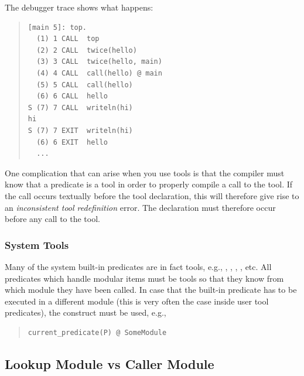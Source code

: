 The debugger trace shows what happens:
\begin{quote}
\begin{verbatim}
[main 5]: top.
  (1) 1 CALL  top
  (2) 2 CALL  twice(hello)
  (3) 3 CALL  twice(hello, main)
  (4) 4 CALL  call(hello) @ main
  (5) 5 CALL  call(hello)
  (6) 6 CALL  hello
S (7) 7 CALL  writeln(hi)
hi
S (7) 7 EXIT  writeln(hi)
  (6) 6 EXIT  hello
  ...
\end{verbatim}
\end{quote}

One complication that can arise when you use tools is that the compiler
must know that a predicate is a tool in order to properly compile
a call to the tool.
If the call occurs textually before the tool
declaration,  this will therefore give rise to an
\emph{inconsistent tool redefinition} error.
The
declaration must therefore occur before any call to the tool.


\subsubsection{System Tools}
Many of the system built-in predicates are in fact tools, e.g.,
,
,
,
, etc.
All predicates which handle modular items must be tools
so that they know from which module they have been called.
In case that the built-in predicate has to be executed in
a different module (this is very often the case inside
user tool predicates), the
%
construct must be used, e.g.,
\begin{quote}
\begin{verbatim}
current_predicate(P) @ SomeModule
\end{verbatim}
\end{quote}


\subsection{Lookup Module vs Caller Module}

